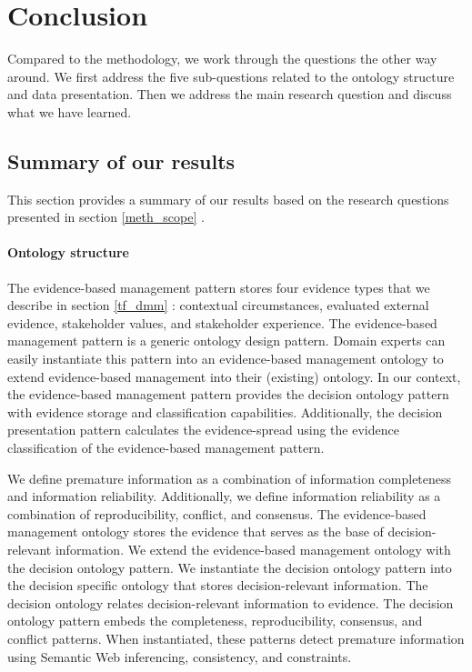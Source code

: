 \section{Conclusion} \label{results}
Compared to the methodology, we work through the questions the other way around. We first address the five sub-questions related to the ontology structure and data presentation. Then we address the main research question and discuss what we have learned.

\subsection{Summary of our results}
This section provides a summary of our results based on the research questions presented in section \ref{meth_scope} .
\paragraph{Ontology structure}
\begin{center}
\large\color{document}{\rqdsone}
\end{center}
The evidence-based management pattern stores four evidence types that we describe in section \ref{tf_dmm} : contextual circumstances, evaluated external evidence, stakeholder values, and stakeholder experience. The evidence-based management pattern is a generic ontology design pattern. Domain experts can easily instantiate this pattern into an evidence-based management ontology to extend evidence-based management into their (existing) ontology. In our context, the evidence-based management pattern provides the decision ontology pattern with evidence storage and classification capabilities. Additionally, the decision presentation pattern calculates the evidence-spread using the evidence classification of the evidence-based management pattern.

\begin{center}
\large\color{document}{\rqdstwo} 
\end{center}
We define premature information as a combination of information completeness and information reliability. Additionally, we define information reliability as a combination of reproducibility, conflict, and consensus. The evidence-based management ontology stores the evidence that serves as the base of decision-relevant information. We extend the evidence-based management ontology with the decision ontology pattern. We instantiate the decision ontology pattern into the decision specific ontology that stores decision-relevant information. The decision ontology relates decision-relevant information to evidence. The decision ontology pattern embeds the completeness, reproducibility, consensus, and conflict patterns. When instantiated, these patterns detect premature information using Semantic Web inferencing, consistency, and constraints.


